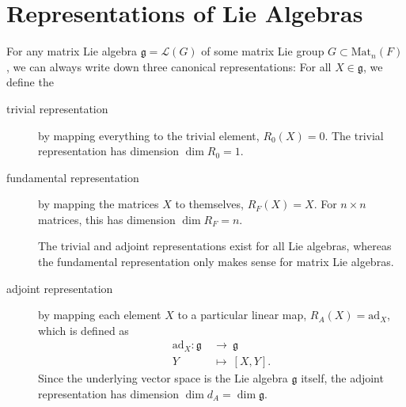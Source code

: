 \section{Representations of Lie Algebras}%
\label{sec:representations_of_lie_algebras}

For any matrix Lie algebra $\mathfrak{g} = \mathscr{L}(G)$ of some matrix Lie group $G \subset \text{Mat}_n(F)$, we can always write down three canonical representations: For all $X \in \mathfrak{g}$, we define the
\begin{description}
  \item[trivial representation] by mapping everything to the trivial element, $R_0(X) = 0$. The trivial representation has dimension $\dim R_0 = 1$.
  \item[fundamental representation] by mapping the matrices $X$ to themselves, $R_F(X) = X$. For $n \times n$ matrices, this has dimension $\dim R_F = n$.
  \begin{leftbar}
    \begin{remark}
      The trivial and adjoint representations exist for all Lie algebras, whereas the fundamental representation only makes sense for matrix Lie algebras.
    \end{remark}
  \end{leftbar}
\item[adjoint representation] by mapping each element $X$ to a particular linear map, $R_A(X) = \text{ad}_X$, which is defined as
    \begin{equation}
      \begin{split}
        \text{ad}_X \colon \mathfrak{g} \ &\to\  \mathfrak{g} \\
	Y \ &\mapsto\  [X,Y].
      \end{split}
    \end{equation}
    Since the underlying vector space is the Lie algebra $\mathfrak{g}$ itself, the adjoint representation has dimension $\dim d_A = \dim \mathfrak{g}$.
\end{description}


